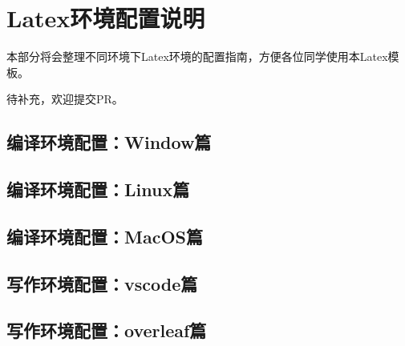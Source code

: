 \chapter{Latex环境配置说明}

\label{cha:sysu-thesis-latex-install-guide}

本部分将会整理不同环境下Latex环境的配置指南，方便各位同学使用本Latex模板。

待补充，欢迎提交PR。


\section{编译环境配置：Window篇}
\section{编译环境配置：Linux篇}
\section{编译环境配置：MacOS篇}


\section{写作环境配置：vscode篇}
\section{写作环境配置：overleaf篇}

